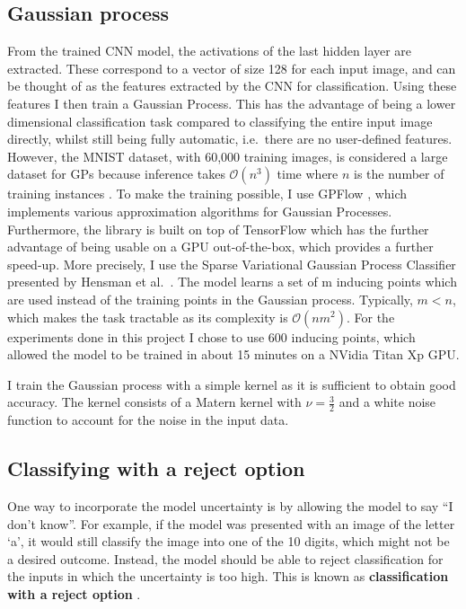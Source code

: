 \documentclass{article}
\begin{document}
\subsection{Gaussian process}
From the trained CNN model, the activations of the last hidden layer are extracted. These correspond to a vector of size 128 for each input image, and can be thought of as the features extracted by the CNN for classification. Using these features I then train a Gaussian Process. This has the advantage of being a lower dimensional classification task compared to classifying the entire input image directly, whilst still being fully automatic, i.e.\ there are no user-defined features. However, the MNIST dataset, with 60,000 training images, is considered a large dataset for GPs because inference takes $\mathcal{O}(n^3)$ time where $n$ is the number of training instances \cite{hensman2015scalable}. To make the training possible, I use GPFlow \cite{GPflow2017}, which implements various approximation algorithms for Gaussian Processes. Furthermore, the library is built on top of TensorFlow which has the further advantage of being usable on a GPU out-of-the-box, which provides a further speed-up. More precisely, I use the Sparse Variational Gaussian Process Classifier presented by Hensman et al.\ \cite{hensman2015scalable}. The model learns a set of m inducing points which are used instead of the training points in the Gaussian process. Typically, $m < n$, which makes the task tractable as its complexity is $\mathcal{O}(nm^2)$. For the experiments done in this project I chose to use 600 inducing points, which allowed the model to be trained in about 15 minutes on a NVidia Titan Xp GPU.

I train the Gaussian process with a simple kernel as it is sufficient to obtain good accuracy. The kernel consists of a Matern kernel  \cite{rasmussen2006gaussian} with $\nu =\frac{3}{2}$ and a white noise function to account for the noise in the input data.

\subsection{Classifying with a reject option}
\label{section/reject_option}
One way to incorporate the model uncertainty is by allowing the model to say ``I don't know''. For example, if the model was presented with an image of the letter `a', it would still classify the image into one of the 10 digits, which might not be a desired outcome. Instead, the model should be able to reject classification for the inputs in which the uncertainty is too high. This is known as \textbf{classification with a reject option} \cite{chow1970optimum}. 
\end{document}
